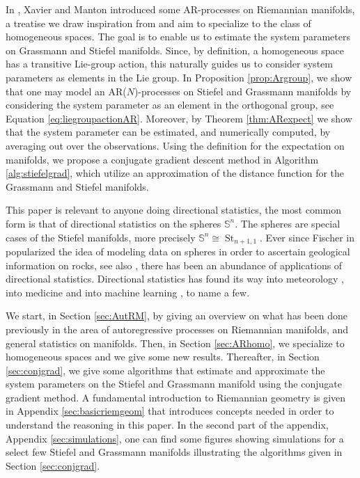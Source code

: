 \documentclass[12pt,a4paper]{article}
\theoremstyle{definition}
\theoremstyle{remark}
\DeclareMathOperator{\St}{St}
\begin{document}
In \cite{xavier2006generalization}, Xavier and Manton introduced some AR-processes on Riemannian manifolds, a treatise we draw inspiration from and aim to specialize to the class of homogeneous spaces. The goal is to enable us to estimate the system parameters on Grassmann and Stiefel manifolds. Since, by definition, a homogeneous space has a transitive Lie-group action, this naturally guides us to consider system parameters as elements in the Lie group. In Proposition \ref{prop:Argroup}, we show that one may model an AR($N$)-processes on Stiefel and Grassmann manifolds by considering the system parameter as an element in the orthogonal group, see Equation \eqref{eq:liegroupactionAR}. Moreover, by Theorem \ref{thm:ARexpect} we show that the system parameter can be estimated, and numerically computed, by averaging out over the observations. Using the definition for the expectation on manifolds, we propose a conjugate gradient descent method in Algorithm \ref{alg:stiefelgrad}, which utilize an approximation of the distance function for the Grassmann and Stiefel manifolds.

This paper is relevant to anyone doing directional statistics, the most common form is that of directional statistics on the spheres $\mathbb{S}^n$. The spheres are special cases of the Stiefel manifolds, more precisely $\mathbb{S}^n \cong \St_{n+1,1}$. Ever since Fischer in \cite{fisher1953dispersion} popularized the idea of modeling data on spheres in order to ascertain geological information on rocks, see also \cite{mardia2025fisher}, there has been an abundance of applications of directional statistics. Directional statistics has found its way into meteorology \cite{bowers2000directional,li2018wavefront,nunez2015bayesian,Nunez-Gutierrez-Escarela-2011}, into medicine \cite{demir2019application,karaibrahimoglu2021circular} and into machine learning \cite{kanamori2012non}, to name a few.


We start, in Section \ref{sec:AutRM}, by giving an overview on what has been done previously in the area of autoregressive processes on Riemannian manifolds, and general statistics on manifolds. Then, in Section \ref{sec:ARhomo}, we specialize to homogeneous spaces and we give some new results. Thereafter, in Section \ref{sec:conjgrad}, we give some algorithms that estimate and approximate the system parameters on the Stiefel and Grassmann manifold using the conjugate gradient method. A fundamental introduction to Riemannian geometry is given in Appendix \ref{sec:basicriemgeom} that introduces concepts needed in order to understand the reasoning in this paper. In the second part of the appendix, Appendix \ref{sec:simulations}, one can find some figures showing simulations for a select few Stiefel and Grassmann manifolds illustrating the algorithms given in Section \ref{sec:conjgrad}.
\end{document}
